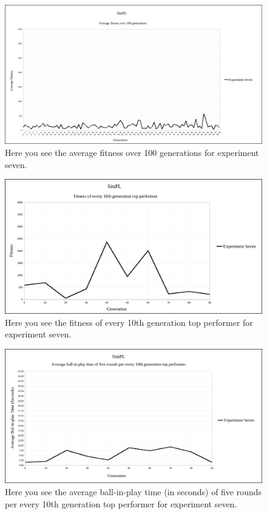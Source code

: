 \begin{figure}[htbp]  
  \centering
  \includegraphics[width=5in]{../Figures/Chapter3/exp7_avg_fit.png}
  \caption[Experiment Seven Average Fitness]{Here you see the average fitness over 100 generations for experiment seven.}
  \label{fig:exp7_avg_fit}
\end{figure}

\begin{figure}[htbp]  
  \centering
  \includegraphics[width=5in]{../Figures/Chapter3/exp7_10_tops.png}
  \caption[Experiment Seven Top Performers]{Here you see the fitness of every 10th generation top performer for experiment seven.}
  \label{fig:exp7_10_tops}
\end{figure}

\begin{figure}[htbp]  
  \centering
  \includegraphics[width=5in]{../Figures/Chapter3/exp7_10_tops_times.png}
  \caption[Experiment Seven Top Performers Tournament]{Here you see the average ball-in-play time (in seconds) of five rounds per every 10th generation top performer for experiment seven.}
  \label{fig:exp7_10_tops_times}
\end{figure}

